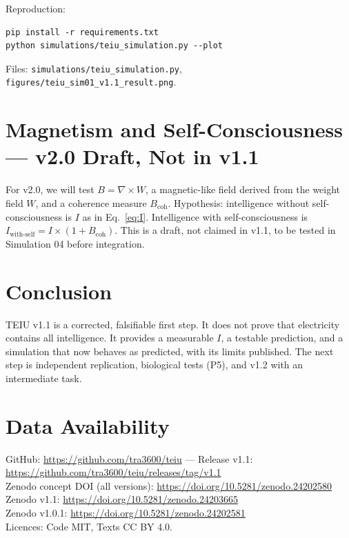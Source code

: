 \documentclass[11pt,a4paper]{article}
\begin{document}
Reproduction:
\begin{verbatim}
pip install -r requirements.txt
python simulations/teiu_simulation.py --plot
\end{verbatim}
Files: \texttt{simulations/teiu\_simulation.py}, \texttt{figures/teiu\_sim01\_v1.1\_result.png}.

\section{Magnetism and Self-Consciousness --- v2.0 Draft, Not in v1.1}
For v2.0, we will test $B = \nabla \times W$, a magnetic-like field derived from the weight field $W$, and a coherence measure $B_{\text{coh}}$. Hypothesis: intelligence without self-consciousness is $I$ as in Eq.~\ref{eq:I}. Intelligence with self-consciousness is $I_{\text{with-self}} = I \times (1 + B_{\text{coh}})$. This is a draft, not claimed in v1.1, to be tested in Simulation 04 before integration.

\section{Conclusion}
TEIU v1.1 is a corrected, falsifiable first step. It does not prove that electricity contains all intelligence. It provides a measurable $I$, a testable prediction, and a simulation that now behaves as predicted, with its limits published. The next step is independent replication, biological tests (P5), and v1.2 with an intermediate task.

\section*{Data Availability}
GitHub: \url{https://github.com/tra3600/teiu} --- Release v1.1: \url{https://github.com/tra3600/teiu/releases/tag/v1.1}\\
Zenodo concept DOI (all versions): \url{https://doi.org/10.5281/zenodo.24202580}\\
Zenodo v1.1: \url{https://doi.org/10.5281/zenodo.24203665}\\
Zenodo v1.0.1: \url{https://doi.org/10.5281/zenodo.24202581}\\
Licences: Code MIT, Texts CC BY 4.0.
\end{document}
